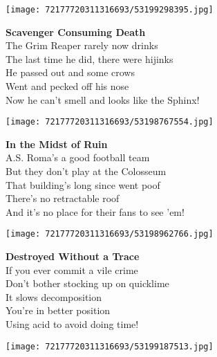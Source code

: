 \documentclass[10pt,letterpaper]{article}
\begin{document}
\begin{center}\texttt{[image: 72177720311316693/53199298395.jpg]}
\end{center}
\begin{center}
\textbf{Scavenger Consuming Death}\\
\vskip 0.2in
The Grim Reaper rarely now drinks\\
The last time he did, there were hijinks\\
He passed out and some crows\\
Went and pecked off his nose\\
Now he can't smell and looks like the Sphinx!\\
\end{center}
\pagebreak

\begin{center}\texttt{[image: 72177720311316693/53198767554.jpg]}
\end{center}
\begin{center}
\textbf{In the Midst of Ruin}\\
\vskip 0.2in
A.S. Roma's a good football team\\
But they don't play at the Colosseum\\
That building's long since went poof\\
There's no retractable roof\\
And it's no place for their fans to see 'em!\\
\end{center}
\pagebreak

\begin{center}\texttt{[image: 72177720311316693/53198962766.jpg]}
\end{center}
\begin{center}
\textbf{Destroyed Without a Trace}\\
\vskip 0.2in
If you ever commit a vile crime\\
Don't bother stocking up on quicklime\\
It slows decomposition\\
You're in better position\\
Using acid to avoid doing time!\\
\end{center}
\pagebreak

\begin{center}
\texttt{[image: 72177720311316693/53199187513.jpg]}
\end{center}
\end{document}
